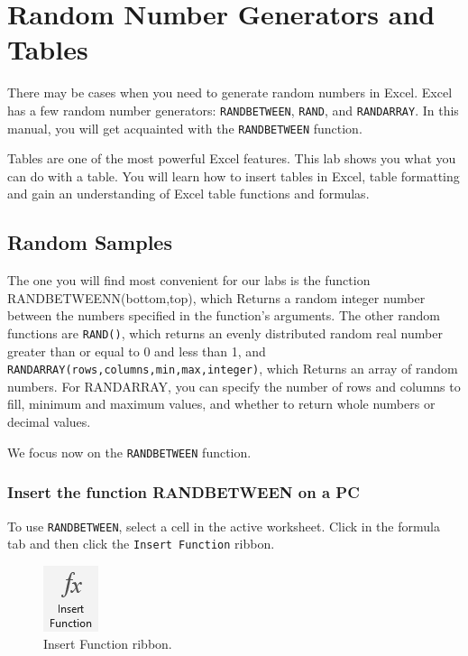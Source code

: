 \documentclass[
  12pt,
  letterpaper,
]{book}
\begin{document}
\hypertarget{number-gen}{%
\chapter{Random Number Generators and Tables}\label{number-gen}}

There may be cases when you need to generate random numbers in Excel. Excel has a few random number generators: \texttt{RANDBETWEEN}, \texttt{RAND}, and \texttt{RANDARRAY}. In this manual, you will get acquainted with the \texttt{RANDBETWEEN} function.

Tables are one of the most powerful Excel features. This lab shows you what you can do with a table. You will learn how to insert tables in Excel, table formatting and gain an understanding of Excel table functions and formulas.

\hypertarget{random-samples}{%
\section{Random Samples}\label{random-samples}}

The one you will find most convenient for our labs is the function RANDBETWEENN(bottom,top), which Returns a random integer number between the numbers specified in the function's arguments. The other random functions are \texttt{RAND()}, which returns an evenly distributed random real number greater than or equal to 0 and less than 1, and \texttt{RANDARRAY(rows,columns,min,max,integer)}, which Returns an array of random numbers. For RANDARRAY, you can specify the number of rows and columns to fill, minimum and maximum values, and whether to return whole numbers or decimal values.

We focus now on the \texttt{RANDBETWEEN} function.

\hypertarget{insert-the-function-randbetween-on-a-pc}{%
\subsection{Insert the function RANDBETWEEN on a PC}\label{insert-the-function-randbetween-on-a-pc}}

To use \texttt{RANDBETWEEN}, select a cell in the active worksheet. Click in the formula tab and then click the \texttt{Insert\ Function} ribbon.

\begin{figure}

{\centering \includegraphics[width=0.1\linewidth]{images/fx-pc} 

}

\caption{Insert Function ribbon.}\label{fig:function-button}
\end{figure}
\end{document}
